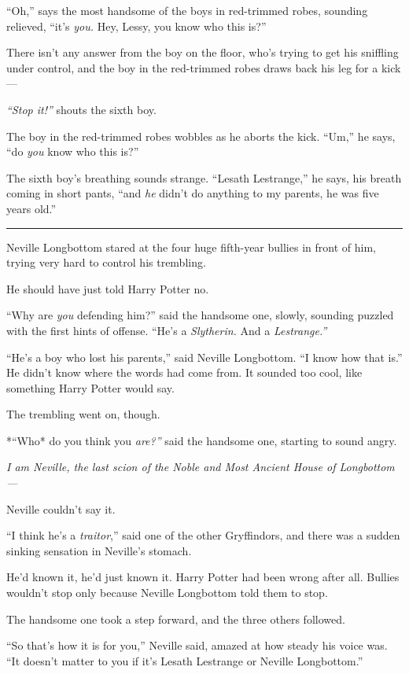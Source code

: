 ``Oh,'' says the most handsome of the boys in red-trimmed robes,
sounding relieved, ``it's \emph{you.} Hey, Lessy, you know who this
is?''

There isn't any answer from the boy on the floor, who's trying to get
his sniffling under control, and the boy in the red-trimmed robes draws
back his leg for a kick---

\emph{``Stop it!''} shouts the sixth boy.

The boy in the red-trimmed robes wobbles as he aborts the kick. ``Um,''
he says, ``do \emph{you} know who this is?''

The sixth boy's breathing sounds strange. ``Lesath Lestrange,'' he says,
his breath coming in short pants, ``and \emph{he} didn't do anything to
my parents, he was five years old.''

\begin{center}\rule{3in}{0.4pt}\end{center}

Neville Longbottom stared at the four huge fifth-year bullies in front
of him, trying very hard to control his trembling.

He should have just told Harry Potter no.

``Why are \emph{you} defending him?'' said the handsome one, slowly,
sounding puzzled with the first hints of offense. ``He's a
\emph{Slytherin.} And a \emph{Lestrange.''}

``He's a boy who lost his parents,'' said Neville Longbottom. ``I know
how that is.'' He didn't know where the words had come from. It sounded
too cool, like something Harry Potter would say.

The trembling went on, though.

*``Who* do you think you \emph{are?''} said the handsome one, starting
to sound angry.

\emph{I am Neville, the last scion of the Noble and Most Ancient House
of Longbottom---}

Neville couldn't say it.

``I think he's a \emph{traitor},'' said one of the other Gryffindors,
and there was a sudden sinking sensation in Neville's stomach.

He'd known it, he'd just known it. Harry Potter had been wrong after
all. Bullies wouldn't stop only because Neville Longbottom told them to
stop.

The handsome one took a step forward, and the three others followed.

``So that's how it is for you,'' Neville said, amazed at how steady his
voice was. ``It doesn't matter to you if it's Lesath Lestrange or
Neville Longbottom.''

